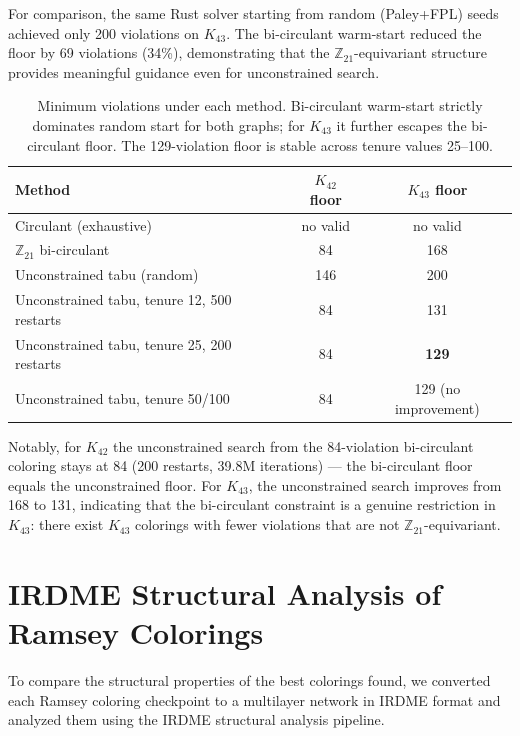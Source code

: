 \documentclass[11pt]{article}
\begin{document}
For comparison, the same Rust solver starting from random (Paley+FPL) seeds
achieved only 200 violations on $K_{43}$.
The bi-circulant warm-start reduced the floor by 69 violations (34\%),
demonstrating that the $\mathbb{Z}_{21}$-equivariant structure provides
meaningful guidance even for unconstrained search.

\begin{table}[h]
\centering
\begin{tabular}{lcc}
\toprule
Method & $K_{42}$ floor & $K_{43}$ floor \\
\midrule
Circulant (exhaustive)        & no valid & no valid \\
$\mathbb{Z}_{21}$ bi-circulant & 84        & 168 \\
Unconstrained tabu (random)   & 146       & 200 \\
Unconstrained tabu, tenure 12, 500 restarts & 84   & 131 \\
Unconstrained tabu, tenure 25, 200 restarts & 84   & \textbf{129} \\
Unconstrained tabu, tenure 50/100           & 84   & 129 (no improvement) \\
\bottomrule
\end{tabular}
\caption{Minimum violations under each method. Bi-circulant warm-start strictly dominates random start for both graphs; for $K_{43}$ it further escapes the bi-circulant floor. The 129-violation floor is stable across tenure values 25--100.}
\label{tab:landscape}
\end{table}

Notably, for $K_{42}$ the unconstrained search from the 84-violation bi-circulant
coloring stays at 84 (200 restarts, 39.8M iterations) — the bi-circulant floor
equals the unconstrained floor.
For $K_{43}$, the unconstrained search improves from 168 to 131, indicating
that the bi-circulant constraint is a genuine restriction in $K_{43}$:
there exist $K_{43}$ colorings with fewer violations that are not
$\mathbb{Z}_{21}$-equivariant.

\section{IRDME Structural Analysis of Ramsey Colorings}
\label{sec:irdme}

To compare the structural properties of the best colorings found, we converted
each Ramsey coloring checkpoint to a multilayer network in IRDME format
\cite{fpl2024} and analyzed them using the IRDME structural analysis pipeline.
\end{document}
